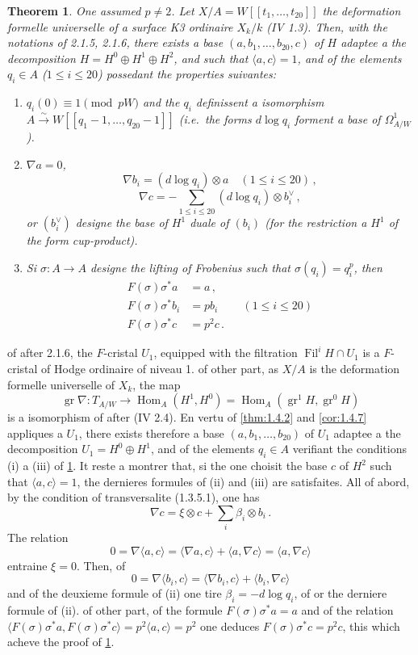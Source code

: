 \documentclass[12pt,a4paper]{article}
\theoremstyle{plain}
\newtheorem{theorem}{Theorem}[section]
\theoremstyle{definition}
\theoremstyle{remark}
\DeclareMathOperator{\Hom}{Hom}
\DeclareMathOperator{\gr}{gr}
\DeclareMathOperator{\Fil}{Fil}
\begin{document}
\begin{theorem}\label{thm:2.1.7}
One assumed $p \neq 2$. Let $X/A = W[[t_1, \ldots, t_{20}]]$ the deformation formelle universelle of a surface K3 ordinaire $X_k/k$ (IV 1.3). Then, with the notations of 2.1.5, 2.1.6, there exists a base $(a, b_1, \ldots, b_{20}, c)$ of $H$ adaptee a the decomposition $H = H^0 \oplus H^1 \oplus H^2$, and such that $\langle a, c \rangle = 1$, and of the elements $q_i \in A$ ($1 \leq i \leq 20$) possedant the properties suivantes:
\begin{enumerate}[label=(\roman*)]
\item $q_i(0) \equiv 1 \pmod{pW}$ and the $q_i$ definissent a isomorphism $A \xrightarrow{\sim} W[[q_1 - 1, \ldots, q_{20} - 1]]$ (i.e.\ the forms $d\log q_i$ forment a base of $\Omega^1_{A/W}$).
\item $\nabla a = 0$,
\[
\nabla b_i = (d\log q_i) \otimes a \quad (1 \leq i \leq 20)\,,
\]
\[
\nabla c = -\sum_{1 \leq i \leq 20} (d\log q_i) \otimes b_i^\vee\,,
\]
or $(b_i^\vee)$ designe the base of $H^1$ duale of $(b_i)$ (for the restriction a $H^1$ of the form cup-product).
\item Si $\sigma : A \to A$ designe the lifting of Frobenius such that $\sigma(q_i) = q_i^p$, then
\[
\begin{aligned}
F(\sigma)\sigma^*a &= a\,,\\
F(\sigma)\sigma^*b_i &= pb_i && (1 \leq i \leq 20)\\
F(\sigma)\sigma^*c &= p^2c\,.\end{aligned}
\]
\end{enumerate}
\end{theorem}

of after 2.1.6, the $F$-cristal $U_1$, equipped with the filtration $\Fil^iH \cap U_1$ is a $F$-cristal of Hodge ordinaire of niveau 1. of other part, as $X/A$ is the deformation formelle universelle of $X_k$, the map
\[
\gr\nabla : T_{A/W} \longrightarrow \Hom_A(H^1, H^0) = \Hom_A(\gr^1H, \gr^0H)
\]
is a isomorphism of after (IV 2.4). En vertu of \ref{thm:1.4.2} and \ref{cor:1.4.7} appliques a $U_1$, there exists therefore a base $(a, b_1, \ldots, b_{20})$ of $U_1$ adaptee a the decomposition $U_1 = H^0 \oplus H^1$, and of the elements $q_i \in A$ verifiant the conditions (i) a (iii) of \ref{thm:2.1.7}. It reste a montrer that, si the one choisit the base $c$ of $H^2$ such that $\langle a, c \rangle = 1$, the dernieres formules of (ii) and (iii) are satisfaites. All of abord, by the condition of transversalite (1.3.5.1), one has
\[
\nabla c = \xi \otimes c + \sum_i \beta_i \otimes b_i\,.\]
The relation
\[
0 = \nabla\langle a, c\rangle = \langle\nabla a, c\rangle + \langle a, \nabla c\rangle = \langle a, \nabla c\rangle
\]
entraine $\xi = 0$. Then, of
\[
0 = \nabla\langle b_i, c\rangle = \langle\nabla b_i, c\rangle + \langle b_i, \nabla c\rangle
\]
and of the deuxieme formule of (ii) one tire $\beta_i = -d\log q_i$, of or the derniere formule of (ii). of other part, of the formule $F(\sigma)\sigma^*a = a$ and of the relation $\langle F(\sigma)\sigma^*a, F(\sigma)\sigma^*c\rangle = p^2\langle a, c\rangle = p^2$ one deduces $F(\sigma)\sigma^*c = p^2c$, this which acheve the proof of \ref{thm:2.1.7}.
\end{document}
